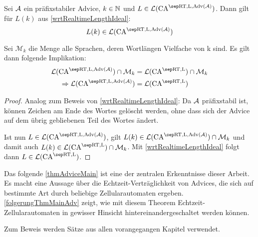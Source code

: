 \begin{lemma}
    \label{wrtRealtimeLengthIdealAdvice}
    
    Sei $\mathcal{A}$ ein präfixstabiler Advice, $k \in \mathbb{N}$ und $L \in \CAL{\CART, \CALeft, \orakel({\advA})}$.
    Dann gilt für $L(k)$ aus \cref{wrtRealtimeLengthIdeal}:
    \[
        L(k) \in \CAL{\CART, \CALeft, \orakel({\advA})}
    \]
    
    Sei $\mathcal{M}_k$ die Menge alle Sprachen, deren Wortlängen Vielfache von k sind.
    Es gilt dann folgende Implikation:
    \begin{align*}
        \CAL{\CART, \CALeft, \orakel({\advA})} \cap \mathcal{M}_k  & = \CAL{\CART, \CALeft} \cap \mathcal{M}_k \\
        \Rightarrow
        \CAL{\CART, \CALeft, \orakel({\advA})} & = \CAL{\CART, \CALeft}
    \end{align*}
\end{lemma}
\begin{proof}
    Analog zum Beweis von \cref{wrtRealtimeLengthIdeal}:
    Da $\mathcal{A}$ präfixstabil ist, können Zeichen am Ende des Wortes gelöscht werden, ohne dass sich
    der Advice auf dem übrig gebliebenen Teil des Wortes ändert.
    
    Ist nun $L \in \CAL{\CART, \CALeft, \orakel({\advA})}$,
    gilt $L(k) \in \CAL{\CART, \CALeft, \orakel({\advA})} \cap \mathcal{M}_k$
    und damit auch
    $L(k) \in \CAL{\CART, \CALeft} \cap \mathcal{M}_k$.
    Mit \cref{wrtRealtimeLengthIdeal} folgt dann $L \in \CAL{\CART, \CALeft}$.
\end{proof}

Das folgende \cref{thmAdviceMain} ist eine der zentralen Erkenntnisse dieser Arbeit.
Es macht eine Aussage über die Echtzeit-Verträglichkeit von Advices,
die sich auf bestimmte Art durch beliebige Zellularautomaten ergeben.
\cref{folgerungThmMainAdv} zeigt, wie mit diesem Theorem Echtzeit-Zellularautomaten
in gewisser Hinsicht hintereinandergeschaltet werden können.

Zum Beweis werden Sätze aus allen vorangegangen Kapitel verwendet.

